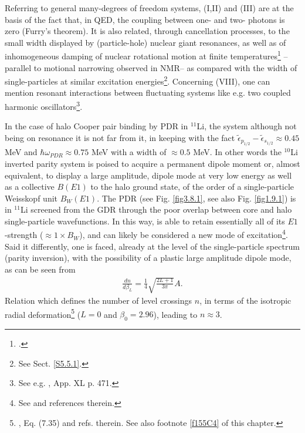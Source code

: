  Referring to general many-degrees of freedom systems, (I,II) and (III) are at the basis of the fact that, in QED, the coupling between one- and two- photons is zero (Furry's theorem). It is also related, through cancellation processes, to the small width displayed by (particle-hole) nuclear giant resonances, as well as of inhomogeneous damping of nuclear  rotational motion at finite temperatures\footnote{\cite{Broglia:87}.} --parallel to motional narrowing observed in NMR--  as compared with the  width of single-particles at  similar excitation energies\footnote{See Sect. \ref{S5.5.1}.}. Concerning (VIII), one can mention resonant interactions between fluctuating systems like e.g. two coupled harmonic oscillators\footnote{See e.g. \cite{Born:69}, App. XL p. 471.}. 


In the case of halo Cooper pair binding by PDR in $^{11}$Li, the system although not being on resonance it is not far from it, in keeping with the fact $\widetilde\epsilon_{p_{1/2}}-\widetilde\epsilon_{s_{1/2}}\approx 0.45$ MeV and $\hbar\omega_{PDR}\approx0.75$ MeV with a width of $\approx0.5$ MeV. In other words the $^{10}$Li inverted parity system is poised to acquire a permanent dipole moment or, almost equivalent, to display a large amplitude, dipole mode at very low energy as well as a collective $B(E1)$ to the halo ground state, of the order of a single-particle Weisskopf unit $B_{W}(E1)$. The PDR (see Fig. \ref{fig3.8.1}, see also Fig. \ref{fig1.9.1}) is in $^{11}$Li  screened from the GDR through the poor overlap between core and halo single-particle wavefunctions. In this way, is able to retain essentially all of its  $E1$-strength ($\approx1\times B_{W}$), and can likely be considered a new mode of excitation\footnote{See \cite{Broglia:19} and references therein.}. Said it differently, one is faced, already at the level of the single-particle spectrum (parity inversion), with the possibility of a plastic large amplitude dipole mode, as can be seen from  
\begin{align}\label{eq3C6}
\frac{dn}{d\beta_L}=\frac{1}{4}\sqrt{\frac{2L+1}{3\pi}}A.
\end{align}  
Relation which defines the number of level crossings $n$, in terms of the isotropic radial deformation\footnote{\cite{Brink:05}, Eq. (7.35) and refs. therein. See also footnote \ref{f155C4} of this chapter.} 
($L=0$ and $\beta_0=2.96$),  leading to $n\approx 3$.
